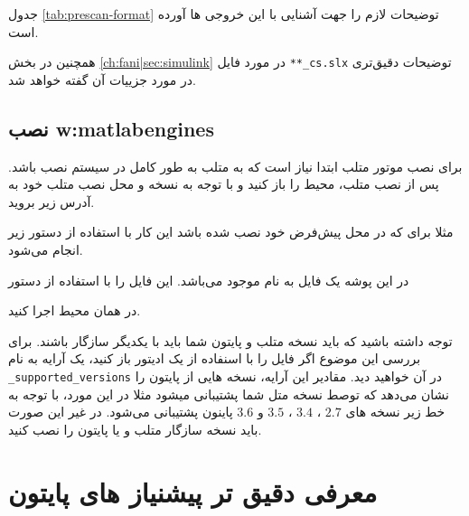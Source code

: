 جدول
\ref{tab:prescan-format}
توضیحات لازم را جهت آشنایی با این خروجی ها آورده است.

همچنین در بخش  
\ref{ch:fani|sec:simulink}
در مورد فایل \texttt{**\_cs.slx} توضیحات دقیق‌تری در مورد جزییات آن گفته خواهد شد.





\subsection{نصب
\glspl{w:matlabengine}
}
برای نصب موتور متلب ابتدا نیاز است که به متلب به طور کامل در سیستم نصب باشد. پس از نصب متلب، محیط  را باز کنید و با توجه به نسخه و محل نصب متلب خود به آدرس زیر بروید.

\begin{center}
\end{center}

مثلا برای  که در محل پیش‌فرض خود نصب شده باشد این کار با استفاده از دستور زیر انجام می‌شود.

\begin{center}
\end{center}

در این پوشه یک فایل به نام  موجود می‌باشد. این فایل را با استفاده از دستور 

\begin{center}
\end{center}

در همان محیط  اجرا کنید.

\begin{note}
	توجه داشته باشید که باید نسخه متلب و پایتون شما باید با یکدیگر سازگار باشند. برای بررسی این موضوع اگر فایل  را با اسنفاده از یک ادیتور باز کنید، یک آرایه به نام \texttt{\_supported\_versions} در آن خواهید دید. مقادیر این آرایه، نسخه هایی از پایتون را نشان می‌دهد که توصط نسخه متل شما پشتیبانی میشود مثلا در این مورد، با توجه به خط زیر نسخه های $2.7$ ، $3.4$ ، $3.5$ و $3.6$ پاینون پشتیبانی می‌شود. در غیر این صورت باید نسخه سازگار متلب و یا پایتون را نصب کنید.
	\begin{center}
	\end{center}
\end{note}

\section{معرفی دقیق تر پیشنیاز های پایتون}
